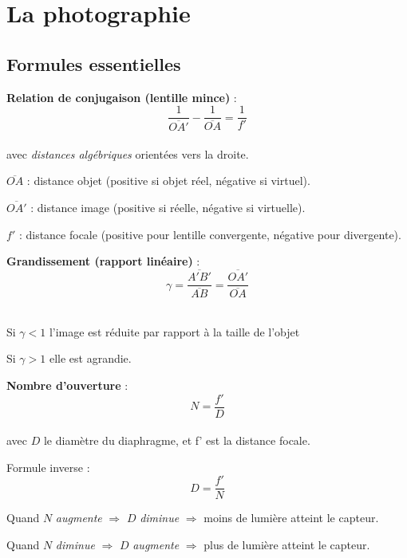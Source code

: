 \documentclass[a4paper,12pt]{article}
\begin{document}
  \section*{La photographie}

 \subsection*{Formules essentielles}

\begin{tcolorbox}[colback=blue!5!white, colframe=blue!75!black,
                  title=Formules essentielles en optique photographique, breakable]
\begin{compactitem}
  \item \textbf{Relation de conjugaison (lentille mince)} :\\
        \[
        \frac{1}{\overline{OA'}} - \frac{1}{\overline{OA}} = \frac{1}{f'}
        \]\\
        \vspace{1em}
        avec \emph{distances algébriques} orientées vers la droite.
        \begin{compactitem}
          \item \(\overline{OA}\) : distance objet (positive si objet réel, négative si virtuel).
          \item \(\overline{OA'}\) : distance image (positive si réelle, négative si virtuelle).
          \item \(f'\) : distance focale (positive pour lentille convergente, négative pour divergente).
        \end{compactitem}

  \item \textbf{Grandissement (rapport linéaire)} :\\
        \[
        \gamma
           = \frac{\overline{A'B'}}{\overline{AB}}
           = \frac{\overline{OA'}}{\overline{OA}}
          \]\\
    \begin{compactitem}
    \item Si $\gamma<1$ l’image est réduite par rapport à la taille de l'objet
    \item Si $\gamma>1$ elle est agrandie.
    \end{compactitem}
  \item \textbf{Nombre d’ouverture} :\\
        \[
          N = \frac{f'}{D}
        \]\\
        \vspace{1em}
        avec \(D\) le diamètre du diaphragme, et f' est la distance focale.
        \begin{compactitem}
          \item Formule inverse : 
          \[
            D = \dfrac{f'}{N}
          \]
          \item Quand \(N\) \emph{augmente} \(\Rightarrow\) \(D\) \emph{diminue} \(\Rightarrow\) moins de lumière atteint le capteur.
          \item Quand \(N\) \emph{diminue} \(\Rightarrow\) \(D\) \emph{augmente} \(\Rightarrow\) plus de lumière atteint le capteur.
        \end{compactitem}


\end{compactitem}
\end{tcolorbox}
\end{document}
